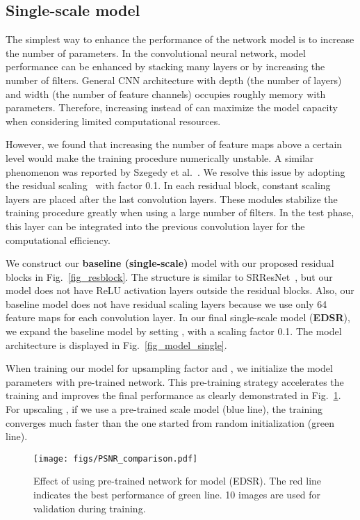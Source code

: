 \documentclass[10pt,twocolumn,letterpaper]{article}
\begin{document}
	\subsection{Single-scale model} 
	\label{sec_3_single}
	
	The simplest way to enhance the performance of the network model is to increase the number of parameters.
	In the convolutional neural network, model performance can be enhanced by stacking many layers or by increasing the number of filters. 
	General CNN architecture with depth (the number of layers)  and width (the number of feature channels)  occupies roughly  memory with  parameters. 
	Therefore, increasing  instead of  can maximize the model capacity when considering limited computational resources.
	
	However, we found that increasing the number of feature maps above a certain level would make the training procedure numerically unstable. A similar phenomenon was reported by Szegedy et al.~\cite{szegedy2016inception}.
	We resolve this issue by adopting the residual scaling~\cite{szegedy2016inception} with factor 0.1.
	In each residual block, constant scaling layers are placed after the last convolution layers.
	These modules stabilize the training procedure greatly when using a large number of filters.
	In the test phase, this layer can be integrated into the previous convolution layer for the computational efficiency.
	
	We construct our \textbf{baseline (single-scale)} model with our proposed residual blocks in Fig.~\ref{fig_resblock}.
	The structure is similar to SRResNet~\cite{ledig2016photo}, but our model does not have ReLU activation layers outside the residual blocks.
	Also, our baseline model does not have residual scaling layers because we use only 64 feature maps for each convolution layer.
	In our final single-scale model (\textbf{EDSR}), we expand the baseline model by setting ,  with a scaling factor 0.1.
	The model architecture is displayed in Fig.~\ref{fig_model_single}.
	
	When training our model for upsampling factor  and , we initialize the model parameters with pre-trained  network.
	This pre-training strategy accelerates the training and improves the final performance as clearly demonstrated in Fig.~\ref{fig_pretrained}.
	For upscaling , if we use a pre-trained scale  model (blue line), the training converges much faster than the one started from random initialization (green line).
		
\begin{figure}[h]
		\begin{center}
			\texttt{[image: figs/PSNR\_comparison.pdf]}
		\end{center}
		\captionsetup{justification=raggedright,singlelinecheck=false}
		\caption{Effect of using pre-trained  network for  model (EDSR). The red line indicates the best performance of green line. 10 images are used for validation during training.}
		\label{fig_pretrained}
	\end{figure}
	
\end{document}

